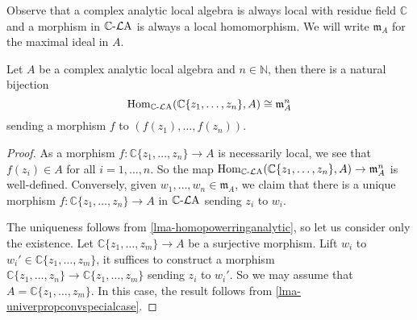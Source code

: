 Observe that a complex analytic local algebra is always local with residue field $\mathbb{C}$ and a morphism in $\mathbb{C}\text{-}\mathcal{L}\mathrm{A}$ is always a local homomorphism. We will write $\mathfrak{m}_A$ for the maximal ideal in $A$.


\begin{lemma}\label{lma-powerseriesfunctorpoint}
    Let $A$ be a complex analytic local algebra and $n\in \mathbb{N}$, then there is a natural bijection
    \[
        \operatorname{Hom}_{\mathbb{C}\text{-}\mathcal{L}\mathrm{A}}(\mathbb{C}\{ z_1,\ldots,z_n \},A)\cong \mathfrak{m}_{A}^n
    \]
    sending a morphism $f$ to $(f(z_1),\ldots,f(z_n))$.
\end{lemma}
\begin{proof}
    As a morphism $f:\mathbb{C}\{ z_1,\ldots,z_n \} \rightarrow A$ is necessarily local, we see that $f(z_i)\in A$ for all $i=1,\ldots,n$. So the map $\operatorname{Hom}_{\mathbb{C}\text{-}\mathcal{L}\mathrm{A}}(\mathbb{C}\{ z_1,\ldots,z_n \},A)\rightarrow \mathfrak{m}_{A}^n$ is well-defined. Conversely, given $w_1,\ldots,w_n\in \mathfrak{m}_A$, we claim that there is a unique morphism $f:\mathbb{C}\{ z_1,\ldots,z_n \} \rightarrow A$ in $\mathbb{C}\text{-}\mathcal{L}\mathrm{A}$ sending $z_i$ to $w_i$.

    The uniqueness follows from \cref{lma-homopowerringanalytic}, so let us consider only the existence.
    Let $\mathbb{C}\{ z_1,\ldots,z_m \} \rightarrow A$ be a surjective morphism. Lift $w_i$ to $w_i'\in \mathbb{C}\{ z_1,\ldots,z_m \}$, it suffices to construct a morphism $\mathbb{C}\{ z_1,\ldots,z_n \}\rightarrow \mathbb{C}\{ z_1,\ldots,z_m \}$ sending $z_i$ to $w_i'$. So we may assume that $A=\mathbb{C}\{ z_1,\ldots,z_m \}$. In this case, the result follows from \cref{lma-univerpropconvspecialcase}.
\end{proof}

